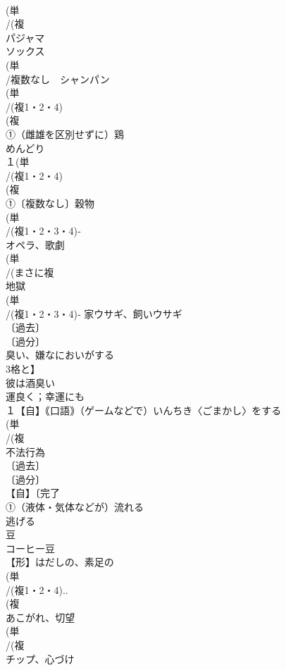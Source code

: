 \documentclass[8pt]{extreport}
\begin{document}
\begin{CJK}{UTF8}{min}
\\	(単
\\	/(複
\\	パジャマ 
\\	ソックス 
\\	(単
\\	/複数なし　シャンパン 
\\	(単
\\	/(複1・2・4)
\\	(複
\\	①（雌雄を区別せずに）鶏 
\\	めんどり 
\\	１(単
\\	/(複1・2・4)
\\	(複
\\	①〔複数なし〕穀物 
\\	(単
\\	/(複1・2・3・4)‐
\\	オペラ、歌劇 
\\	(単
\\	/(まさに複
\\	地獄 
\\	(単
\\	/(複1・2・3・4)‐ 家ウサギ、飼いウサギ 
\\	〔過去〕
\\	〔過分〕
\\	臭い、嫌なにおいがする 
\\	3格と】
\\	彼は酒臭い
\\	運良く；幸運にも
\\	１【自】｟口語｠（ゲームなどで）いんちき〈ごまかし〉をする 
\\	(単
\\	/(複
\\	不法行為 
\\	〔過去〕
\\	〔過分〕
\\	【自】〔完了
\\	①（液体・気体などが）流れる 
\\	逃げる
\\	豆 
\\	コーヒー豆 
\\	【形】はだしの、素足の
\\	(単
\\	/(複1・2・4)..
\\	(複
\\	あこがれ、切望 
\\	(単
\\	/(複
\\	チップ、心づけ 

\end{CJK}
\end{document}
